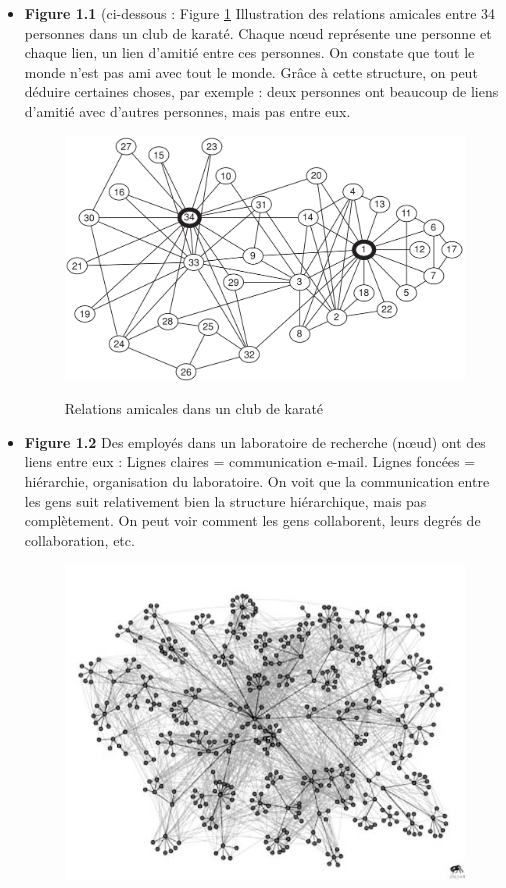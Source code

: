 \begin{itemize}

	\item \textbf{Figure 1.1} (ci-dessous : Figure \ref{karate} Illustration des relations amicales entre 34 personnes dans un club de karaté.
Chaque nœud représente une personne et chaque lien, un lien d'amitié entre ces personnes.
On constate que tout le monde n'est pas ami avec tout le monde. Grâce à cette structure, on peut déduire certaines choses, par exemple : deux personnes ont beaucoup de liens d'amitié avec d'autres personnes, mais pas entre eux.

\begin{center}
\begin{figure}[!ht]
\includegraphics[width=0.9\linewidth]{images/17_karate_club.png}
\label{karate}
\caption{Relations amicales dans un club de karaté}
\end{figure}
\end{center}

	\item \textbf{Figure 1.2} Des employés dans un laboratoire de recherche (nœud) ont des liens entre eux :
Lignes claires = communication e-mail.
Lignes foncées = hiérarchie, organisation du laboratoire.
On voit que la communication entre les gens suit relativement bien la structure hiérarchique, mais pas complètement. On peut voir comment les gens collaborent, leurs degrés de collaboration, etc.

\begin{figure}[!h]
\centering
\includegraphics[width=0.8\linewidth]{images/social_networks_based_on_communication_and_interaction.png}
\end{figure}


\end{itemize}

